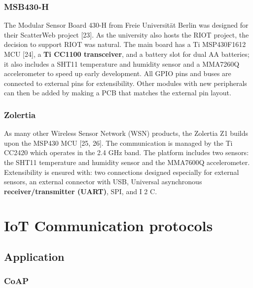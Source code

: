 \subsubsection{MSB430-H}

The Modular Sensor Board 430-H from Freie Universität Berlin was designed for their ScatterWeb project [23].
As the university also hosts the RIOT project,
	the decision to support RIOT was natural.
The main board has a Ti MSP430F1612 MCU [24],
	a \textbf{Ti CC1100 transceiver},
	and a battery slot for dual AA batteries;
	it also includes a SHT11 temperature and humidity sensor and a MMA7260Q accelerometer to speed up early development.
All GPIO pins and buses are connected to external pins for extensibility.
Other modules with new peripherals can then be added by making a PCB that matches the external pin layout.

\subsubsection{Zolertia}

As many other Wireless Sensor Network (WSN) products,
	the Zolertia Z1 builds upon the MSP430 MCU [25, 26].
The communication is managed by the Ti CC2420 which operates in the 2.4 GHz band.
The platform includes two sensors:
	the SHT11 temperature and humidity sensor and the MMA7600Q accelerometer.
Extensibility is ensured with:
	two connections designed especially for external sensors,
	an external connector with USB,
	Universal asynchronous \textbf{receiver/transmitter (UART)},
	SPI,
	and I 2 C.


\section{IoT Communication protocols}


\subsection{Application}

\subsubsection{CoAP}

